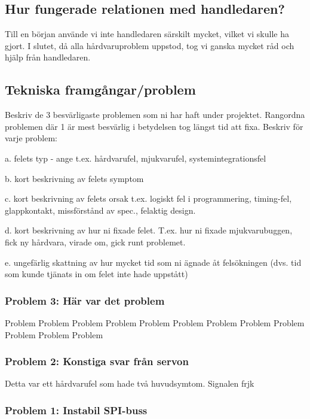 \documentclass[a4paper,titlepage,12pt]{article}
\begin{document}
	\subsection{Hur fungerade relationen med handledaren?}
    Till en början använde vi inte handledaren särskilt mycket, vilket vi
    skulle ha gjort. I slutet, då alla hårdvaruproblem uppstod, tog vi ganska
    mycket råd och hjälp från handledaren.
	
	\subsection{Tekniska framgångar/problem}
	Beskriv de 3 besvärligaste problemen som ni har haft under projektet. 
	Rangordna problemen där 1 är mest besvärlig i betydelsen tog längst tid att fixa.
	Beskriv för varje problem:

	a. felets typ - ange t.ex.  hårdvarufel, mjukvarufel, systemintegrationsfel 

	b. kort beskrivning av felets symptom 

	c. kort beskrivning av felets orsak t.ex. logiskt fel i programmering, timing-fel, glappkontakt, missförstånd av spec., felaktig design. 

	d. kort beskrivning av hur ni fixade felet. T.ex. hur ni fixade mjukvarubuggen, fick ny hårdvara, virade om, gick runt problemet.

	e. ungefärlig skattning av hur mycket tid som ni ägnade åt felsökningen (dvs. tid som kunde tjänats in om felet inte hade uppstått)
	

    \subsubsection{Problem 3: Här var det problem}

    Problem     Problem     Problem     Problem     Problem     Problem
    Problem     Problem     Problem     Problem     Problem     Problem 

    \subsubsection{Problem 2: Konstiga svar från servon}

    Detta var ett hårdvarufel som hade två huvudsymtom. Signalen frjk

    \subsubsection{Problem 1: Instabil SPI-buss}
\end{document}
